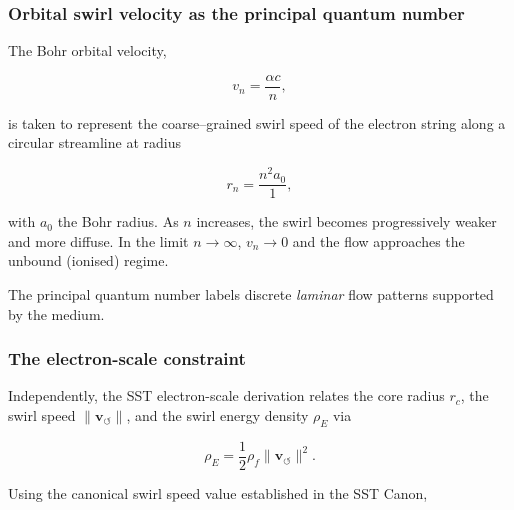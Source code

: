 \documentclass[10pt,reprint,aps,onecolumn,nofootinbib]{revtex4-2}
\begin{document}
        \subsubsection*{Orbital swirl velocity as the principal quantum number}

            The Bohr orbital velocity,

            \begin{equation}
                v_n = \frac{\alpha c}{n},
            \end{equation}

            is taken to represent the coarse--grained swirl speed of the electron
            string along a circular streamline at radius

            \begin{equation}
                r_n = \frac{n^2 a_0}{1},
            \end{equation}

            with $a_0$ the Bohr radius. As $n$ increases, the swirl becomes
            progressively weaker and more diffuse. In the limit $n\to\infty$,
            $v_n\to 0$ and the flow approaches the unbound (ionised) regime.

            The principal quantum number labels discrete \emph{laminar} flow
            patterns supported by the medium.

        \subsubsection*{The electron-scale constraint}

            Independently, the SST electron-scale derivation relates the core radius
            $r_c$, the swirl speed $\lVert \mathbf{v}_{\!\boldsymbol{\circlearrowleft}}
    \rVert$, and the swirl energy density $\rho_{\!E}$ via

            \begin{equation}
                \rho_{\!E}
                = \frac{1}{2}\rho_{\!f}
                \lVert \mathbf{v}_{\!\boldsymbol{\circlearrowleft}} \rVert^{2}.
            \end{equation}

            Using the canonical swirl speed value established in the SST Canon,
\end{document}
